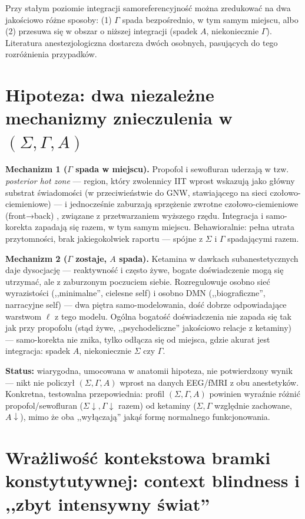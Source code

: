 \documentclass[11pt]{article}
\begin{document}
Przy stałym poziomie integracji samoreferencyjność można zredukować na dwa jakościowo różne sposoby: (1) $\Gamma$ spada bezpośrednio, w tym samym miejscu, albo (2) przesuwa się w obszar o niższej integracji (spadek $A$, niekoniecznie $\Gamma$). Literatura anestezjologiczna dostarcza dwóch osobnych, pasujących do tego rozróżnienia przypadków.

\section{Hipoteza: dwa niezależne mechanizmy znieczulenia w $(\Sigma,\Gamma,A)$}

\textbf{Mechanizm 1 ($\Gamma$ spada w miejscu).} Propofol i sewofluran uderzają w tzw. \emph{posterior hot zone} \cite{hotzone2021} --- region, który zwolennicy IIT wprost wskazują jako główny substrat świadomości (w przeciwieństwie do GNW, stawiającego na sieci czołowo-ciemieniowe) --- i jednocześnie zaburzają sprzężenie zwrotne czołowo-ciemieniowe (front→back) \cite{sarasso2013}, związane z przetwarzaniem wyższego rzędu. Integracja i samo-korekta zapadają się razem, w tym samym miejscu. Behawioralnie: pełna utrata przytomności, brak jakiegokolwiek raportu --- spójne z $\Sigma$ i $\Gamma$ spadającymi razem.

\textbf{Mechanizm 2 ($\Gamma$ zostaje, $A$ spada).} Ketamina w dawkach subanestetycznych daje dysocjację --- reaktywność i często żywe, bogate doświadczenie mogą się utrzymać, ale z zaburzonym poczuciem siebie. Rozregulowuje osobno sieć wyrazistości (,,minimalne'', cielesne self) i osobno DMN (,,biograficzne'', narracyjne self) \cite{vollenweider2022} --- dwa piętra samo-modelowania, dość dobrze odpowiadające warstwom $\ell$ z tego modelu. Ogólna bogatość doświadczenia nie zapada się tak jak przy propofolu (stąd żywe, ,,psychodeliczne'' jakościowo relacje z ketaminy) --- samo-korekta nie znika, tylko odłącza się od miejsca, gdzie akurat jest integracja: spadek $A$, niekoniecznie $\Sigma$ czy $\Gamma$.

\textbf{Status:} wiarygodna, umocowana w anatomii hipoteza, nie potwierdzony wynik --- nikt nie policzył $(\Sigma,\Gamma,A)$ wprost na danych EEG/fMRI z obu anestetyków. Konkretna, testowalna przepowiednia: profil $(\Sigma,\Gamma,A)$ powinien wyraźnie różnić propofol/sewofluran ($\Sigma\downarrow,\Gamma\downarrow$ razem) od ketaminy ($\Sigma,\Gamma$ względnie zachowane, $A\downarrow$), mimo że oba ,,wyłączają'' jakąś formę normalnego funkcjonowania.

\section{Wrażliwość kontekstowa bramki konstytutywnej: context blindness i ,,zbyt intensywny świat''}
\end{document}
